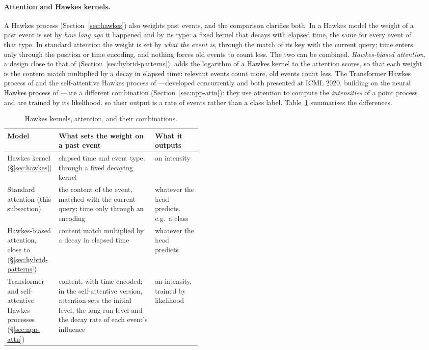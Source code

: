 \paragraph{Attention and Hawkes kernels.} A Hawkes process (Section~\ref{sec:hawkes}) also weights past events, and the
comparison clarifies both. In a Hawkes model the weight of a past event is set by \emph{how long ago} it happened and
by its type: a fixed kernel that decays with elapsed time, the same for every event of that type. In standard
attention the weight is set by \emph{what the event is}, through the match of its key with the current query; time
enters only through the position or time encoding, and nothing forces old events to count less. The two can be
combined. \emph{Hawkes-biased attention}, a design close to that of \citet{hwang2025shockbiased}
(Section~\ref{sec:hybrid-patterns}), adds the logarithm of
a Hawkes kernel to the attention scores, so that each weight is the content match multiplied by a decay in elapsed
time: relevant events count more, old events count less. The Transformer Hawkes process of \citet{zuo2020thp} and the self-attentive Hawkes
process of \citet{zhang2020sahp}---developed concurrently and both presented at ICML 2020, building on the neural
Hawkes process of \citet{mei2017}---are a different combination (Section~\ref{sec:npp-attn}): they use attention to
compute the \emph{intensities} of a point process and are trained by its likelihood, so their output is a rate of
events rather than a class label.
Table~\ref{tab:attn-hawkes} summarises the differences.

\begin{table}[!htbp]
\centering\footnotesize
\caption{Hawkes kernels, attention, and their combinations.}
\label{tab:attn-hawkes}
\begin{tabularx}{\linewidth}{>{\raggedright\arraybackslash}p{0.22\linewidth}>{\raggedright\arraybackslash}X>{\raggedright\arraybackslash}p{0.24\linewidth}}
\toprule
Model & What sets the weight on a past event & What it outputs \\
\midrule
Hawkes kernel (\S\ref{sec:hawkes}) & elapsed time and event type, through a fixed decaying kernel & an intensity \\
Standard attention (this subsection) & the content of the event, matched with the current query; time only through an encoding & whatever the head predicts, e.g.\ a class \\
Hawkes-biased attention, close to \citet{hwang2025shockbiased} (\S\ref{sec:hybrid-patterns}) & content match multiplied by a decay in elapsed time & whatever the head predicts \\
Transformer and self-attentive Hawkes processes~\citep{zuo2020thp,zhang2020sahp} (\S\ref{sec:npp-attn}) & content, with time encoded; in the self-attentive version, attention sets the initial level, the long-run level and the decay rate of each event's influence & an intensity, trained by likelihood \\
\bottomrule
\end{tabularx}
\end{table}

